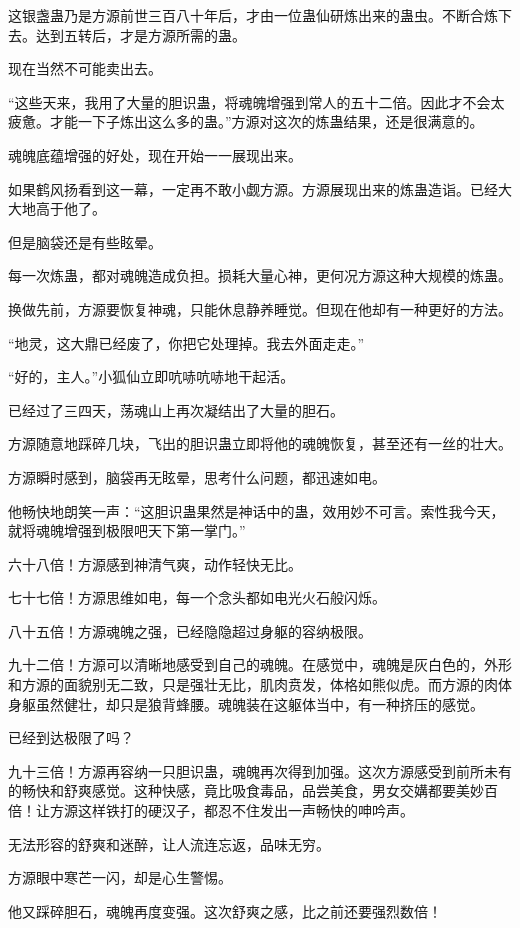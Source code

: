 \begin{this_body}
这银盏蛊乃是方源前世三百八十年后，才由一位蛊仙研炼出来的蛊虫。不断合炼下去。达到五转后，才是方源所需的蛊。

现在当然不可能卖出去。

“这些天来，我用了大量的胆识蛊，将魂魄增强到常人的五十二倍。因此才不会太疲惫。才能一下子炼出这么多的蛊。”方源对这次的炼蛊结果，还是很满意的。

魂魄底蕴增强的好处，现在开始一一展现出来。

如果鹤风扬看到这一幕，一定再不敢小觑方源。方源展现出来的炼蛊造诣。已经大大地高于他了。

但是脑袋还是有些眩晕。

每一次炼蛊，都对魂魄造成负担。损耗大量心神，更何况方源这种大规模的炼蛊。

换做先前，方源要恢复神魂，只能休息静养睡觉。但现在他却有一种更好的方法。

“地灵，这大鼎已经废了，你把它处理掉。我去外面走走。”

“好的，主人。”小狐仙立即吭哧吭哧地干起活。

已经过了三四天，荡魂山上再次凝结出了大量的胆石。

方源随意地踩碎几块，飞出的胆识蛊立即将他的魂魄恢复，甚至还有一丝的壮大。

方源瞬时感到，脑袋再无眩晕，思考什么问题，都迅速如电。

他畅快地朗笑一声：“这胆识蛊果然是神话中的蛊，效用妙不可言。索性我今天，就将魂魄增强到极限吧天下第一掌门。”

六十八倍！方源感到神清气爽，动作轻快无比。

七十七倍！方源思维如电，每一个念头都如电光火石般闪烁。

八十五倍！方源魂魄之强，已经隐隐超过身躯的容纳极限。

九十二倍！方源可以清晰地感受到自己的魂魄。在感觉中，魂魄是灰白色的，外形和方源的面貌别无二致，只是强壮无比，肌肉贲发，体格如熊似虎。而方源的肉体身躯虽然健壮，却只是狼背蜂腰。魂魄装在这躯体当中，有一种挤压的感觉。

已经到达极限了吗？

九十三倍！方源再容纳一只胆识蛊，魂魄再次得到加强。这次方源感受到前所未有的畅快和舒爽感觉。这种快感，竟比吸食毒品，品尝美食，男女交媾都要美妙百倍！让方源这样铁打的硬汉子，都忍不住发出一声畅快的呻吟声。

无法形容的舒爽和迷醉，让人流连忘返，品味无穷。

方源眼中寒芒一闪，却是心生警惕。

他又踩碎胆石，魂魄再度变强。这次舒爽之感，比之前还要强烈数倍！


\end{this_body}
